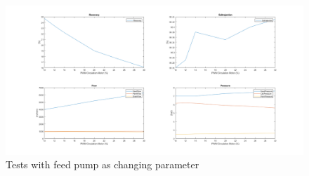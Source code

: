 \begin{figure}[h]
    \centering 
    \includegraphics[width=1.65\textwidth, angle=270]{PreTestReg3.png}
    \caption{Tests with feed pump as changing parameter}
    \label{fig:PreTestReg3}
\end{figure}





